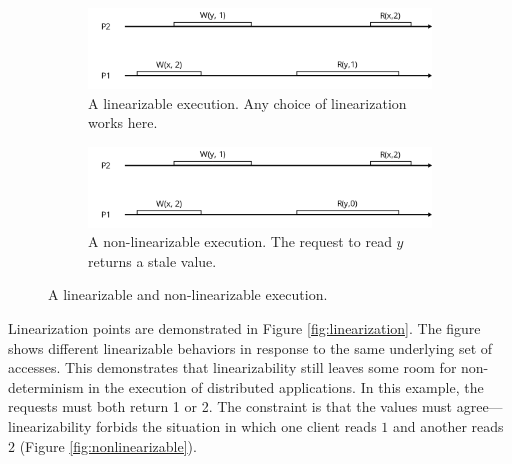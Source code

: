 \documentclass[]             %
{NASA}                       %
\theoremstyle{definition}
\begin{document}
\begin{figure}
     \begin{subfigure}[a]{1\textwidth}
         \center
         \includegraphics[scale=0.4]{images/linear1.png}
         \caption{A linearizable execution. Any choice of linearization works here.}
         \label{fig:linear_example11}
     \end{subfigure}
     \begin{subfigure}[b]{1\textwidth}
         \center
         \includegraphics[scale=0.4]{images/nonlinear0.png}
         \caption{A non-linearizable execution. The request to read $y$ returns a stale value. }
         \label{fig:linear_example12}
     \end{subfigure}
  \caption{A linearizable and non-linearizable execution.}
  \label{fig:linear_example1}
\end{figure}

Linearization points are demonstrated in Figure \ref{fig:linearization}.
The figure shows different linearizable behaviors in response to the
same underlying set of accesses. This demonstrates that linearizability
still leaves some room for non-determinism in the execution of
distributed applications. In this example, the requests must both return
1 or 2. The constraint is that the values must agree---linearizability
forbids the situation in which one client reads \(1\) and another reads
\(2\) (Figure \ref{fig:nonlinearizable}).
\end{document}
